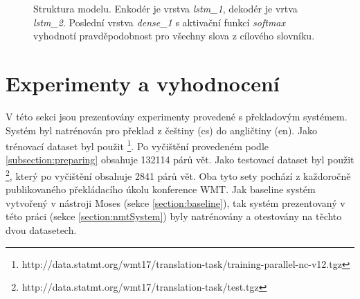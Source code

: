 

\begin{figure}[h]
    \begin{center}
    \end{center}
	\caption{Struktura modelu. Enkodér je vrstva \emph{lstm\_1}, dekodér je vrtva \emph{lstm\_2}. Poslední vrstva \emph{dense\_1} s aktivační funkcí \emph{softmax} vyhodnotí pravděpodobnost pro všechny slova z cílového slovníku.}
	\label{img:model}
\end{figure}


%


\chapter{Experimenty a vyhodnocení} \label{chapter:results}
V této sekci jsou prezentovány experimenty provedené s překladovým systémem. Systém byl natrénován pro překlad z češtiny (cs) do angličtiny (en). Jako trénovací dataset byl použit \footnote{http://data.statmt.org/wmt17/translation-task/training-parallel-nc-v12.tgz}. Po vyčištění provedeném podle \ref{subsection:preparing} obsahuje 132114 párů vět. Jako testovací dataset byl použit \footnote{http://data.statmt.org/wmt17/translation-task/test.tgz}, který po vyčištění obsahuje 2841 párů vět. Oba tyto sety pochází z každoročně publikovaného překládacího úkolu konference WMT. Jak baseline systém vytvořený v nástroji Moses (sekce \ref{section:baseline}), tak systém prezentovaný v této práci (sekce \ref{section:nmtSystem}) byly natrénovány a otestovány na těchto dvou datasetech.

